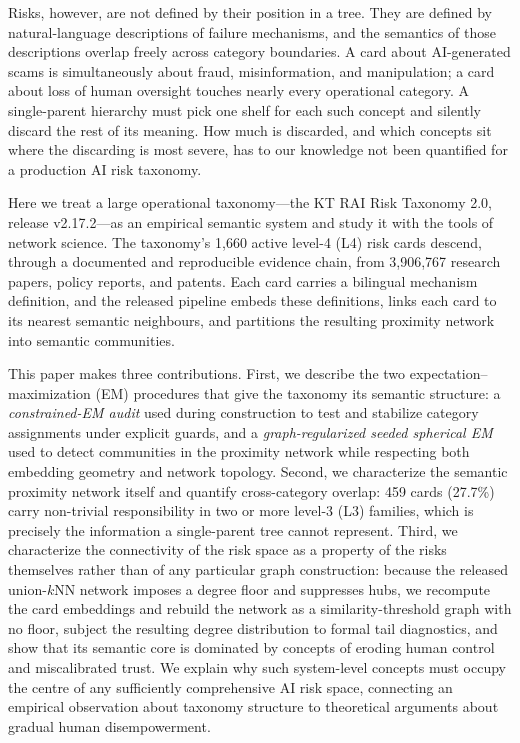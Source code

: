 \documentclass[fleqn,10pt]{wlscirep}
\begin{document}
Risks, however, are not defined by their position in a tree. They are defined
by natural-language descriptions of failure mechanisms, and the semantics of
those descriptions overlap freely across category boundaries. A card about
AI-generated scams is simultaneously about fraud, misinformation, and
manipulation; a card about loss of human oversight touches nearly every
operational category. A single-parent hierarchy must pick one shelf for each
such concept and silently discard the rest of its meaning. How much is
discarded, and which concepts sit where the discarding is most severe, has to
our knowledge not been quantified for a production AI risk taxonomy.

Here we treat a large operational taxonomy---the KT RAI Risk Taxonomy 2.0,
release v2.17.2---as an empirical semantic system and study it with the tools
of network science\cite{newman2018}. The taxonomy's 1,660 active level-4 (L4)
risk cards descend, through a documented and reproducible evidence chain, from
3,906,767 research papers, policy reports, and patents. Each card carries a
bilingual mechanism definition, and the released pipeline embeds these
definitions\cite{chen2024bgem3}, links each card to its nearest semantic
neighbours, and partitions the resulting proximity network into semantic
communities.

This paper makes three contributions. First, we describe the two
expectation--maximization (EM) procedures\cite{dempster1977} that give the
taxonomy its semantic structure: a \emph{constrained-EM audit} used during
construction to test and stabilize category assignments under explicit
guards, and a \emph{graph-regularized seeded spherical EM}\cite{banerjee2005}
used to detect communities in the proximity network while respecting both
embedding geometry and network topology. Second, we characterize the semantic
proximity network itself and quantify cross-category overlap: 459 cards
(27.7\%) carry non-trivial responsibility in two or more level-3 (L3)
families, which is precisely the information a single-parent tree cannot
represent. Third, we characterize the connectivity of the risk space as a
property of the risks themselves rather than of any particular graph
construction: because the released union-$k$NN network imposes a degree
floor and suppresses hubs, we recompute the card embeddings and rebuild the
network as a similarity-threshold graph with no floor, subject the resulting
degree distribution to formal tail diagnostics\cite{clauset2009,broido2019},
and show that its semantic core is dominated by concepts of eroding human
control and miscalibrated trust. We explain why such system-level concepts
must occupy the centre of any sufficiently comprehensive AI risk space,
connecting an empirical observation about taxonomy structure to theoretical
arguments about gradual human disempowerment\cite{russell2019,bengio2024,
kulveit2025}.
\end{document}
